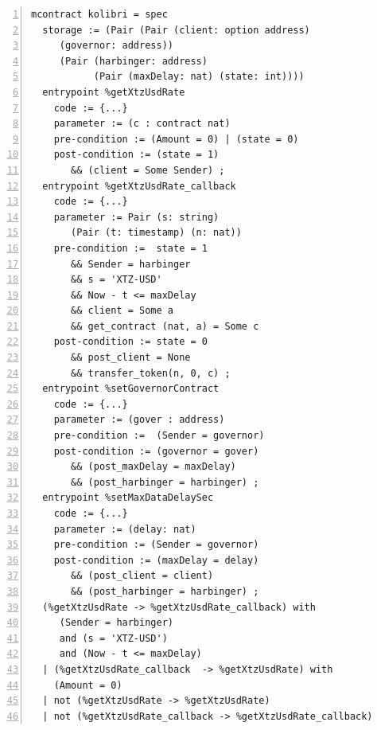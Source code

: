 \documentclass[a4paper,USenglish,cleveref, autoref, thm-restate]{lipics-v2021}
\begin{document}
\begin{lstlisting}[float=tp,captionpos=b,caption={Kolibri oracle contract specification},label={lst:kolibri-contract-specification},numbers=left]
mcontract kolibri = spec 
  storage := (Pair (Pair (client: option address) 
     (governor: address))
     (Pair (harbinger: address) 
           (Pair (maxDelay: nat) (state: int))))
  entrypoint %getXtzUsdRate
    code := {...}
    parameter := (c : contract nat) 
    pre-condition := (Amount = 0) | (state = 0)
    post-condition := (state = 1) 
       && (client = Some Sender) ;
  entrypoint %getXtzUsdRate_callback
    code := {...}
    parameter := Pair (s: string) 
       (Pair (t: timestamp) (n: nat))
    pre-condition :=  state = 1 
       && Sender = harbinger  
       && s = 'XTZ-USD' 
       && Now - t <= maxDelay 
       && client = Some a 
       && get_contract (nat, a) = Some c    
    post-condition := state = 0 
       && post_client = None 
       && transfer_token(n, 0, c) ;
  entrypoint %setGovernorContract
    code := {...}
    parameter := (gover : address) 
    pre-condition :=  (Sender = governor)                  
    post-condition := (governor = gover) 
       && (post_maxDelay = maxDelay) 
       && (post_harbinger = harbinger) ;
  entrypoint %setMaxDataDelaySec
    code := {...}
    parameter := (delay: nat)
    pre-condition := (Sender = governor)             
    post-condition := (maxDelay = delay) 
       && (post_client = client) 
       && (post_harbinger = harbinger) ;
  (%getXtzUsdRate -> %getXtzUsdRate_callback) with
     (Sender = harbinger)
     and (s = 'XTZ-USD') 
     and (Now - t <= maxDelay)  
  | (%getXtzUsdRate_callback  -> %getXtzUsdRate) with 
    (Amount = 0) 
  | not (%getXtzUsdRate -> %getXtzUsdRate) 
  | not (%getXtzUsdRate_callback -> %getXtzUsdRate_callback)
\end{lstlisting}
\end{document}
